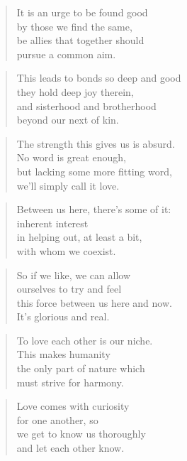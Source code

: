 \documentclass[10pt,a4paper]{article}
\begin{document}
\begin{multicols}{2}
\begin{verse}
It is an urge to be found good\\
by those we find the same,\\
be allies that together should\\
pursue a common aim.
\end{verse}

\begin{verse}
This leads to bonds so deep and good\\
they hold deep joy therein,\\
and sisterhood and brotherhood\\
beyond our next of kin.
\end{verse}

\begin{verse}
The strength this gives us is absurd.\\
No word is great enough,\\
but lacking some more fitting word,\\
we’ll simply call it love.
\end{verse}

\begin{verse}
Between us here, there’s some of it:\\
inherent interest\\
in helping out, at least a bit,\\
with whom we coexist.
\end{verse}

\begin{verse}
So if we like, we can allow\\
ourselves to try and feel\\
this force between us here and now.\\
It’s glorious and real.
\end{verse}

\begin{verse}
To love each other is our niche.\\
This makes humanity\\
the only part of nature which\\
must strive for harmony.
\end{verse}

\begin{verse}
Love comes with curiosity\\
for one another, so\\
we get to know us thoroughly\\
and let each other know.
\end{verse}


\end{multicols}
\end{document}
